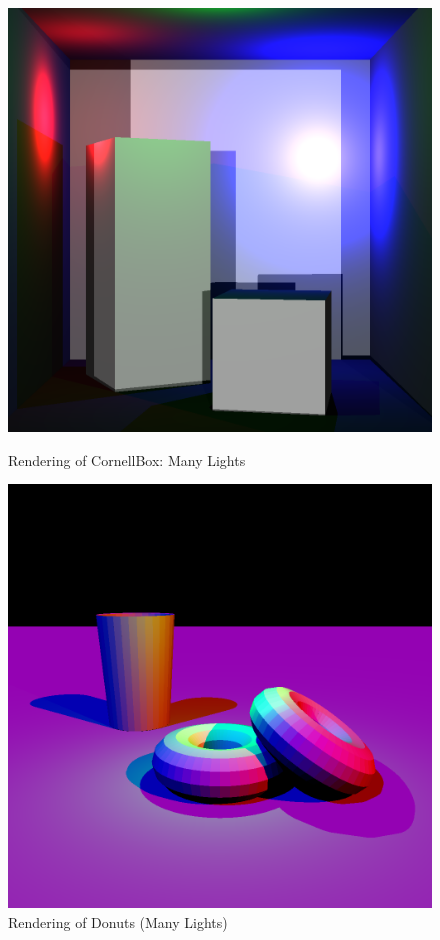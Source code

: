 \documentclass[a4paper]{myarticle}
\begin{document}
\begin{figure}[H]
    \begin{minipage}[t]{.4\textwidth}
        \centering
        \includegraphics[width=\textwidth]{q1/CornellBox/many_lights.png}
        \caption{Rendering of CornellBox: Many Lights}
    \end{minipage}
    \hfill
    \begin{minipage}[t]{.4\textwidth}
        \centering
        \includegraphics[width=\textwidth]{q1/Donuts/scene.png}
        \caption{Rendering of Donuts (Many Lights)}
    \end{minipage}
\end{figure}
\end{document}
